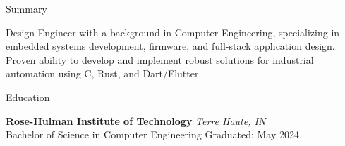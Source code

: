 \documentclass[
	11pt, %
]{resume} %
\begin{document}

\begin{rSection}{Summary}

Design Engineer with a background in Computer Engineering, specializing in embedded systems development, firmware, and full-stack application design. Proven ability to develop and implement robust solutions for industrial automation using C, Rust, and Dart/Flutter.

\end{rSection}


\begin{rSection}{Education}
	
	\textbf{Rose-Hulman Institute of Technology} \hfill \textit{Terre Haute, IN} \\ 
	Bachelor of Science in Computer Engineering \hfill Graduated: May 2024 \\
	
\end{rSection}

\end{document}
